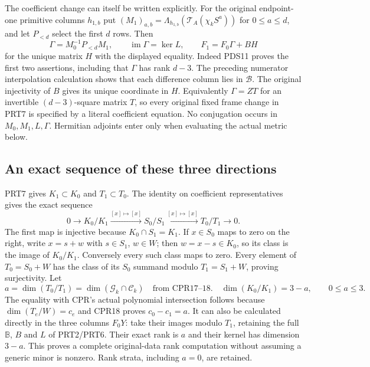 The coefficient change can itself be written explicitly. For the original
endpoint-one primitive columns $h_{1,b}$ put
$ (M_1)_{a,b}=\Lambda_{h_{1,b}}(\mathcal T_A(\chi_kS^a))$
for $0\le a\le d$, and let $P_{<d}$ select the first $d$ rows.
Then
\[
 \Gamma=M_0^{-1}P_{<d}M_1,\qquad
 \operatorname{im}\Gamma=\ker L,\qquad
 F_1=F_0\Gamma+BH
 \tag{PRT7a}
\]
for the unique matrix $H$ with the displayed equality.
Indeed PDS11 proves the first two assertions, including that $\Gamma$
has rank $d-3$. The preceding numerator interpolation calculation
shows that each difference column lies in $\mathscr B$.
The original injectivity of $B$ gives its unique coordinate in $H$.
Equivalently $\Gamma=ZT$ for an invertible $(d-3)$-square matrix $T$,
so every original fixed frame change in PRT7 is specified by a literal
coefficient equation. No conjugation occurs in $M_0,M_1,L,\Gamma$.
Hermitian adjoints enter only when evaluating the actual metric below.

\subsection{An exact sequence of these three directions}

PRT7 gives $K_1\subset K_0$ and $T_1\subset T_0$. The identity on
coefficient representatives gives the exact sequence
\[
 0\longrightarrow K_0/K_1\xrightarrow{[x]\mapsto[x]}
 S_0/S_1\xrightarrow{[x]\mapsto[x]}T_0/T_1\longrightarrow0.
 \tag{PRT9}
\]
The first map is injective because $K_0\cap S_1=K_1$.
If $x\in S_0$ maps to zero on the right, write $x=s+w$ with
$s\in S_1$, $w\in W$; then $w=x-s\in K_0$, so its class is the
image of $K_0/K_1$. Conversely every such class maps to zero. Every
element of $T_0=S_0+W$ has the class of its $S_0$ summand modulo
$T_1=S_1+W$, proving surjectivity.
Let
\[
 a=\dim(T_0/T_1)=\dim(\mathcal G_k\cap\mathcal C_k)
                    \quad\text{from CPR17--18}.
 \quad
 \dim(K_0/K_1)=3-a,\qquad0\le a\le3.
 \tag{PRT10}
\]
The equality with CPR's actual polynomial intersection follows because
$\dim(T_e/W)=c_e$ and CPR18 proves $c_0-c_1=a$. It can also be
calculated directly in the three columns $F_0Y$: take their images
modulo $T_1$, retaining the full $\mathbb B$, $B$ and $L$ of
PRT2/PRT6. Their exact rank is $a$ and their kernel has dimension
$3-a$. This proves a complete original-data rank computation without
assuming a generic minor is nonzero. Rank strata, including $a=0$,
are retained.

